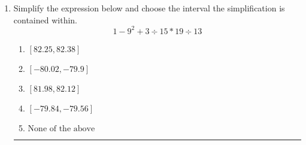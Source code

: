 \documentclass[14pt]{extbook}
\newcommand{\litem}[1]{\item#1\hspace*{-1cm}\rule{\textwidth}{0.4pt}}
\begin{document}
\begin{enumerate}
\litem{
Simplify the expression below and choose the interval the simplification is contained within.\[ 1 - 9^2 + 3 \div 15 * 19 \div 13 \]\begin{enumerate}[label=\Alph*.]
\item \( [82.25, 82.38] \)
\item \( [-80.02, -79.9] \)
\item \( [81.98, 82.12] \)
\item \( [-79.84, -79.56] \)
\item \( \text{None of the above} \)

\end{enumerate} }
\end{enumerate}
\end{document}
